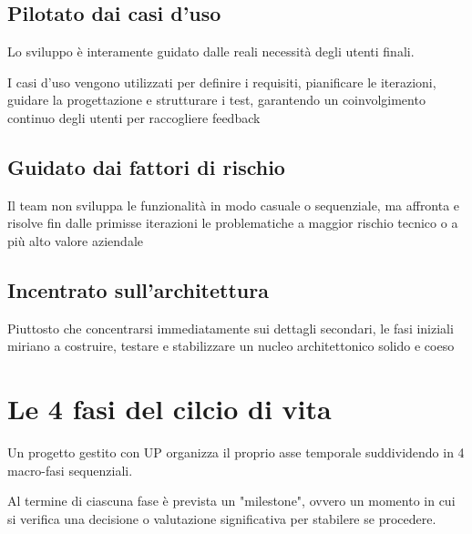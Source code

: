 \subsection{Pilotato dai casi d'uso}
Lo sviluppo è interamente guidato dalle reali necessità degli utenti finali.

I casi d'uso vengono utilizzati per definire i requisiti, pianificare le iterazioni, guidare la progettazione e strutturare i test, garantendo un coinvolgimento continuo degli utenti per raccogliere feedback

\subsection{Guidato dai fattori di rischio}
Il team non sviluppa le funzionalità in modo casuale o sequenziale, ma affronta e risolve fin dalle primisse iterazioni le problematiche a maggior rischio tecnico o a più alto valore aziendale

\subsection{Incentrato sull'architettura}
Piuttosto che concentrarsi immediatamente sui dettagli secondari, le fasi iniziali miriano a costruire, testare e stabilizzare un nucleo architettonico solido e coeso

\section{Le 4 fasi del cilcio di vita}
Un progetto gestito con UP organizza il proprio asse temporale suddividendo in 4 macro-fasi sequenziali.

Al termine di ciascuna fase è prevista un "milestone", ovvero un momento in cui si verifica una decisione o valutazione significativa per stabilere se procedere.

